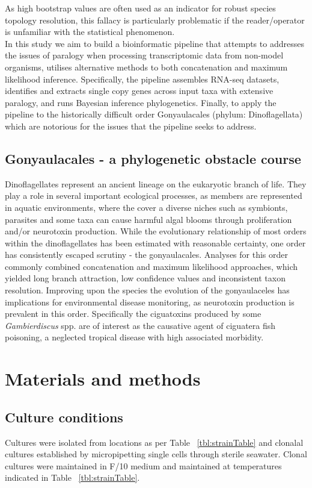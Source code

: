 \documentclass[12pt]{article}
\begin{document}
As high bootstrap values are often used as an indicator for robust species topology resolution, this fallacy is particularly problematic if the reader/operator is unfamiliar with the statistical phenomenon.\\
In this study we aim to build a bioinformatic pipeline that attempts to addresses the issues of paralogy when processing transcriptomic data from non-model organisms, utilises alternative methods to both concatenation and maximum likelihood inference. 
Specifically, the pipeline assembles RNA-seq datasets, identifies and extracts single copy genes across input taxa with extensive paralogy, and runs Bayesian inference phylogenetics. 
Finally, to apply the pipeline to the historically difficult order Gonyaulacales (phylum: Dinoflagellata) which are notorious for the issues that the pipeline seeks to address.\\
\subsection*{Gonyaulacales - a phylogenetic obstacle course}
Dinoflagellates represent an ancient lineage on the eukaryotic branch of life. 
They play a role in several important ecological processes, as members are represented in aquatic environments, where the cover a diverse niches such as symbionts, parasites and some taxa can cause harmful algal blooms through proliferation and/or neurotoxin production.
While the evolutionary relationship of most orders within the dinoflagellates has been estimated with reasonable certainty, one order has consistently escaped scrutiny - the gonyaulacales. 
Analyses for this order commonly combined concatenation and maximum likelihood approaches, which yielded long branch attraction, low confidence values and inconsistent taxon resolution. 
Improving upon the species the evolution of the gonyaulaceles has implications for environmental disease monitoring, as neurotoxin production is prevalent in this order. 
Specifically the ciguatoxins produced by some \emph{Gambierdiscus} spp. are of interest as the causative agent of ciguatera fish poisoning, a neglected tropical disease with high associated morbidity.%


\newpage

\section{Materials and methods}
\subsection*{Culture conditions}
\FloatBarrier
Cultures were isolated from locations as per Table ~\ref{tbl:strainTable} and clonalal cultures established by micropipetting single cells through sterile seawater. Clonal cultures were maintained in F/10 medium and maintained at temperatures indicated in Table ~\ref{tbl:strainTable}.
\end{document}

